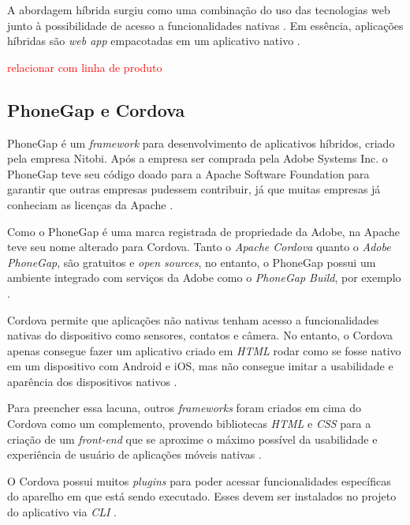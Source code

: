 A abordagem híbrida surgiu como uma combinação do uso das tecnologias web junto à possibilidade de acesso a funcionalidades nativas \cite{heitkotter_evaluating_2013}.
Em essência, aplicações híbridas são \textit{web app} empacotadas em um aplicativo nativo \cite{stark_building_2010}.


\textcolor{red}{relacionar com linha de produto}

\subsection{PhoneGap e Cordova} \label{subsection:phonegap}

PhoneGap é um \textit{framework} para desenvolvimento de aplicativos híbridos, criado pela empresa Nitobi. 
Após a empresa ser comprada pela Adobe Systems Inc. o PhoneGap teve seu código doado para a Apache Software Foundation 
para garantir que outras empresas pudessem contribuir, já que muitas empresas já conheciam as licenças da Apache \cite{bezerra_desenvolvimento_2016}.


Como o PhoneGap é uma marca registrada de propriedade da Adobe, na Apache teve seu nome alterado para Cordova.
Tanto o \textit{Apache Cordova} quanto o \textit{Adobe PhoneGap}, são gratuitos e \textit{open sources}, no entanto, o 
PhoneGap possui um ambiente integrado com serviços da Adobe como o \textit{PhoneGap Build}, por exemplo \cite{bezerra_desenvolvimento_2016}.
 
Cordova permite que aplicações não nativas tenham acesso a funcionalidades nativas do dispositivo como sensores, 
contatos e câmera. No entanto, o Cordova apenas consegue fazer um aplicativo criado em 
\textit{HTML} rodar como se fosse nativo em um dispositivo com Android e iOS, mas não consegue 
imitar a usabilidade e aparência dos dispositivos nativos \cite{bezerra_desenvolvimento_2016}. 

Para preencher essa lacuna, outros \textit{frameworks} foram criados em cima do Cordova como um complemento, 
provendo bibliotecas \textit{HTML} e \textit{CSS} para a 
criação de um \textit{front-end} que se aproxime o máximo possível da usabilidade e experiência de usuário de 
aplicações móveis nativas \cite{bezerra_desenvolvimento_2016}.

O Cordova possui muitos \textit{plugins} para poder acessar funcionalidades específicas do aparelho em que está sendo 
executado. Esses devem ser instalados no projeto do aplicativo via \textit{CLI} \cite{bezerra_desenvolvimento_2016}. 

